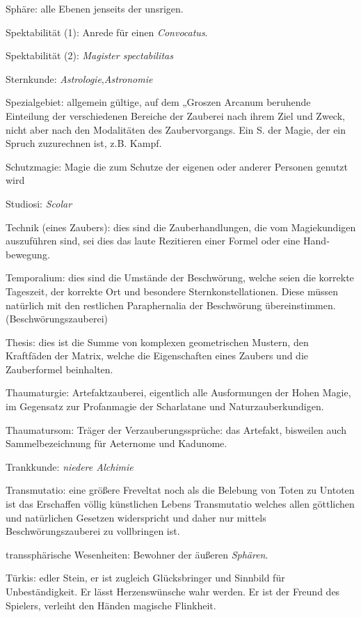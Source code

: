 \documentclass[a5paper,8pt]{book}
\begin{document}
\begin{small}
\begin{description}
 \item Sphäre: alle Ebenen jenseits der unsrigen.
 \item Spektabilität (1): Anrede für einen \textit{Convocatus}.
 \item Spektabilität (2): \textit{Magister spectabilitas}
 \item Sternkunde: \textit{Astrologie},\textit{Astronomie}
 \item Spezialgebiet: allgemein gültige, auf dem „Groszen Arcanum beruhende Einteilung der verschiedenen Bereiche der Zauberei nach ihrem Ziel und Zweck, nicht aber nach den Modalitäten des Zaubervorgangs. Ein S. der Magie, der ein Spruch zuzurechnen ist, z.B. Kampf.
 \item Schutzmagie: Magie die zum Schutze der eigenen oder anderer Personen genutzt wird
 \item Studiosi: \textit{Scolar}
 \item Technik (eines Zaubers): dies sind die Zauber­hand­lungen, die vom Magiekundigen auszuführen sind, sei dies das laute Rezitieren einer Formel oder eine Hand­bewegung.
 \item Temporalium: dies sind die Umstände der Be­schwörung, welche seien die korrekte Tageszeit, der kor­rekte Ort und besondere Sternkonstellationen. Diese müs­sen natürlich mit den restlichen \textit{}Para­phernalia der Be­schwörung übereinstimmen. (\textit{}Beschwörungs­zauberei)
 \item Thesis: dies ist die Summe von komplexen geo­metrischen Mustern, den Kraftfäden der \textit{}Matrix, welche die Eigenschaften eines Zaubers und die Zauberformel beinhalten.
 \item Thaumaturgie: Artefaktzauberei, eigentlich alle Aus­formungen der Hohen Magie, im Gegensatz zur Profan­magie der Scharlatane und Naturzauberkundigen.
 \item Thaumatursom: Träger der Verzauberungssprüche: das Artefakt, bisweilen auch Sammelbezeichnung für \textit{}Aeternome und \textit{}Kadunome.
 \item Trankkunde: \textit{niedere Alchimie}
 \item Transmutatio: eine größere Freveltat noch als die Be­lebung von Toten zu Untoten ist das Erschaffen völlig künstlichen Lebens Transmutatio welches allen gött­lichen und natürlichen Gesetzen widerspricht und daher nur mittels \textit{}Beschwörungszauberei zu voll­bringen ist.
 \item transsphärische Wesenheiten: Bewohner der äußeren \textit{Sphären}.
 \item Türkis: edler Stein, er ist zugleich Glücks­bringer und Sinnbild für Unbeständigkeit. Er lässt Herzenswünsche wahr werden. Er ist der Freund des Spielers, verleiht den Händen magische Flinkheit.

\end{description}
\end{small}
\end{document}
